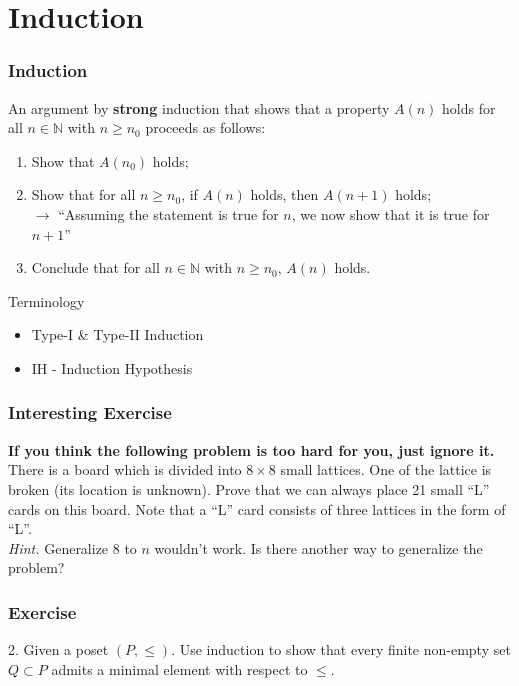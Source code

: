 \documentclass{beamer}
\begin{document}
\section{Induction}
\begin{frame}
    \frametitle{Induction}
    \hh An argument by \textbf{strong} induction that shows that a property $A(n)$ holds for all $n \in \mathbb{N}$  with $n \geqslant n_0 $ proceeds as follows:
		\begin{enumerate}
			\item Show that $A(n_0)$ holds;
			\item Show that for all $n \geqslant n_0 $, if $A(n)$ holds, then $A(n + 1)$ holds;\\
			$\to$ ``Assuming the statement is true for $n$, we now show that it is true for $n + 1$''
			\item Conclude that for all $n \in \mathbb{N}$ with $n \geqslant n_0 $, $A(n)$ holds.
		\end{enumerate}
    \begin{block}{Terminology}
        \begin{itemize}
            \item Type-I \& Type-II Induction
            \item IH - Induction Hypothesis
        \end{itemize}
    \end{block}
\end{frame}
\begin{frame}
    \frametitle{Interesting Exercise}
    \hh \textbf{If you think the following problem is too hard for you, just ignore it.}\\
    \vv 
    \hh There is a board which is divided into $8 \times 8$ small lattices. One of the
    lattice is broken (its location is unknown). Prove that we can always
    place 21 small ``L'' cards on this board. Note that a ``L'' card consists of
    three lattices in the form of ``L''.
    \\ 
    \vs{2em} 
    \hh \textit{Hint.} Generalize $8$ to $n$ wouldn't work. Is there another way to
    generalize the problem?

\end{frame}
\begin{frame}
    \frametitle{Exercise}
    2. Given a poset $(P, \leq)$. Use induction to show that every finite non-empty set
    $Q \subset P$ admits a minimal element with respect to $\leq$.
    
    

\end{frame}
\end{document}
